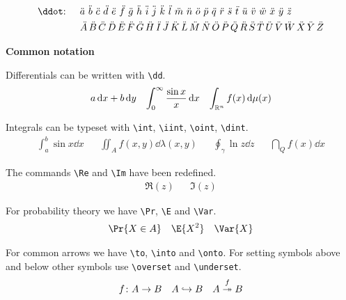 \documentclass{myassignment}
\begin{document}
\begin{align*}
    &\text{\texttt{\textbackslash ddot}: } &&\ddot{a}\,\,\ddot{b}\,\,\ddot{c}\,\,\ddot{d}\,\,\ddot{e}\,\,\ddot{f}\,\,\ddot{g}\,\,\ddot{h}\,\,\ddot{i}\,\,\ddot{j}\,\,\ddot{k}\,\,\ddot{l}\,\,\ddot{m}\,\,\ddot{n}\,\,\ddot{o}\,\,\ddot{p}\,\,\ddot{q}\,\,\ddot{r}\,\,\ddot{s}\,\,\ddot{t}\,\,\ddot{u}\,\,\ddot{v}\,\,\ddot{w}\,\,\ddot{x}\,\,\ddot{y}\,\,\ddot{z} \\
    &&&\ddot{A}\,\ddot{B}\,\ddot{C}\,\ddot{D}\,\ddot{E}\,\ddot{F}\,\ddot{G}\,\ddot{H}\,\ddot{I}\,\ddot{J}\,\ddot{K}\,\ddot{L}\,\ddot{M}\,\ddot{N}\,\ddot{O}\,\ddot{P}\,\ddot{Q}\,\ddot{R}\,\ddot{S}\,\ddot{T}\,\ddot{U}\,\ddot{V}\,\ddot{W}\,\ddot{X}\,\ddot{Y}\,\ddot{Z}
\end{align*}

\newpage

\textbf{Common notation}

Differentials can be written with \texttt{\textbackslash dd}.
\begin{align*}
    a\mathop{}\!\mathrm{d} x + b\mathop{}\!\mathrm{d} y && \int_0^\infty \frac{\sin x}{x} \mathop{}\!\mathrm{d} x && \int_{\mathbb{R}^n} f(x) \mathop{}\!\mathrm{d} \mu(x)
\end{align*}

Integrals can be typeset with \texttt{\textbackslash int}, \texttt{\textbackslash iint}, \texttt{\textbackslash oint}, \texttt{\textbackslash dint}.
\begin{align*}
    \int_a^b \sin x \dd x && \iint_A f(x, y) \dd \lambda(x, y) && \oint_\gamma \ln z \dd z && \dint_Q f(x) \dd x
\end{align*}

The commands \texttt{\textbackslash Re} and \texttt{\textbackslash Im} have been redefined.
\begin{align*}
    \Re(z) && \Im(z)
\end{align*}

For probability theory we have \texttt{\textbackslash Pr}, \texttt{\textbackslash E} and \texttt{\textbackslash Var}.
\begin{align*}
    \Pr{X \in A} && \E{X^2} && \Var{X}
\end{align*}

For common arrows we have \texttt{\textbackslash to}, \texttt{\textbackslash into} and \texttt{\textbackslash onto}. For setting symbols above and below other symbols use \texttt{\textbackslash overset} and \texttt{\textbackslash underset}.
\begin{align*}
    f \colon A \to B && A \hookrightarrow B && A \overset{f}{\twoheadrightarrow} B
\end{align*}
\end{document}
